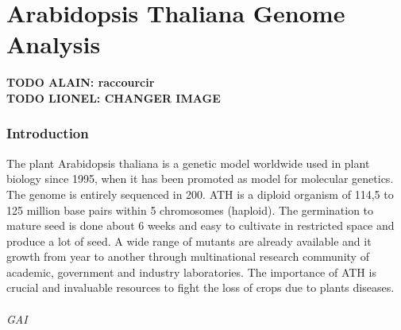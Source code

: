 \documentclass[10pt,a4paper]{article}
\begin{document}
 
 
 
 
 









\newpage
\part*{Arabidopsis Thaliana Genome Analysis}

\textbf{TODO ALAIN: raccourcir}\\

\textbf{TODO LIONEL: CHANGER IMAGE}

\section*{Introduction}
The plant Arabidopsis thaliana is a genetic model worldwide used in plant biology since 1995, when it has been promoted as model for molecular genetics. The genome is entirely sequenced in 200. ATH is a diploid organism of 114,5 to 125 million base pairs within 5 chromosomes (haploid). The germination to mature seed is done about 6 weeks and easy to cultivate in restricted space and produce a lot of seed. A wide range of mutants are already available and it growth from year to another through multinational research community of academic, government and industry laboratories. The importance of ATH is crucial and invaluable resources to fight the loss of crops due to plants diseases.


%
%
%


\paragraph{GAI} 
\end{document}
